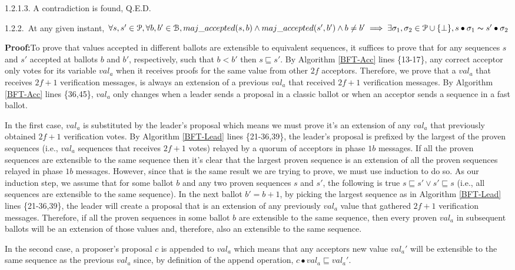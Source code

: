 \indent\indent\indent\indent\indent\indent\indent\parbox{\linewidth}{\strut1.2.1.3. A contradiction is found, Q.E.D. }\par
\indent\indent\indent\indent\indent\parbox{\linewidth-\algorithmicindent*5}{\strut1.2.2.~At any given instant, $\forall s,s' \in \mathcal{P},\forall b,b' \in \mathcal{B}, maj\_accepted(s,b) \land maj\_accepted(s',b') \land b \neq b' \implies \exists \sigma_1,\sigma_2 \in \mathcal{P} \cup \{\bot\}, s \bullet \sigma_1 \thicksim s' \bullet \sigma_2$} 
\indent\indent\indent\indent\indent\indent\parbox{\linewidth-\algorithmicindent*6}{\strut\textbf{Proof:}To prove that values accepted in different ballots are extensible to equivalent sequences, it suffices to prove that for any sequences $s$ and $s'$ accepted at ballots $b$ and $b'$, respectively, such that $b < b'$ then $s \sqsubseteq s'$. By Algorithm \ref{BFT-Acc} lines \{13-17\}, any correct acceptor only votes for its variable $val_a$ when it receives proofs for the same value from other $2f$ acceptors. Therefore, we prove that a $val_a$ that receives $2f+1$ verification messages, is always an extension of a previous $val_a$ that received $2f+1$ verification messages. By Algorithm \ref{BFT-Acc} lines \{36,45\}, $val_a$ only changes when a leader sends a proposal in a classic ballot or when an acceptor sends a sequence in a fast ballot.\par
In the first case, $val_a$ is substituted by the leader's proposal which means we must prove it's an extension of any $val_a$ that previously obtained $2f+1$ verification votes. By Algorithm \ref{BFT-Lead} lines \{21-36,39\}, the leader's proposal is prefixed by the largest of the proven sequences (i.e., $val_a$ sequences that receives $2f+1$ votes) relayed by a quorum of acceptors in phase $1b$ messages. If all the proven sequences are extensible to the same sequence then it's clear that the largest proven sequence is an extension of all the proven sequences relayed in phase $1b$ messages. However, since that is the same result we are trying to prove, we must use induction to do so. As our induction step, we assume that for some ballot $b$ and any two proven sequences $s$ and $s'$, the following is true $s \sqsubseteq s' \lor s' \sqsubseteq s$ (i.e., all sequences are extensible to the same sequence). In the next ballot $b'=b+1$, by picking the largest sequence as in Algorithm \ref{BFT-Lead} lines \{21-36,39\}, the leader will create a proposal that is an extension of any previously $val_a$ value that gathered $2f+1$ verification messages. Therefore, if all the proven sequences in some ballot $b$ are extensible to the same sequence, then every proven $val_a$ in subsequent ballots will be an extension of those values and, therefore, also an extensible to the same sequence.\par
In the second case, a proposer's proposal $c$ is appended to $val_a$ which means that any acceptors new value $val_a'$ will be extensible to the same sequence as the previous $val_a$ since, by definition of the append operation, $c \bullet val_a \sqsubseteq val_a'$.}\par
